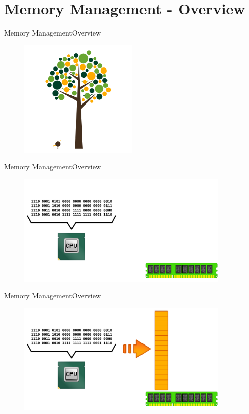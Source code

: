 \documentclass[10pt]{beamer}
\begin{document}
\section{Memory Management - Overview}
\begin{frame}{Memory Management}{Overview}
  \begin{figure}[ht]
    \centering
    \includegraphics[width=0.5\textwidth, keepaspectratio=true]{images/concepts.png}
  \end{figure}
\end{frame}


\begin{frame}{Memory Management}{Overview}
  \begin{figure}[ht]
    \centering
    \includegraphics[width=0.9\textwidth, keepaspectratio=true]{images/virtual_memory_a.png}
  \end{figure}
\end{frame}

\begin{frame}{Memory Management}{Overview}
  \begin{figure}[ht]
    \centering
    \includegraphics[width=0.9\textwidth, keepaspectratio=true]{images/virtual_memory_b.png}
  \end{figure}
\end{frame}
\end{document}

